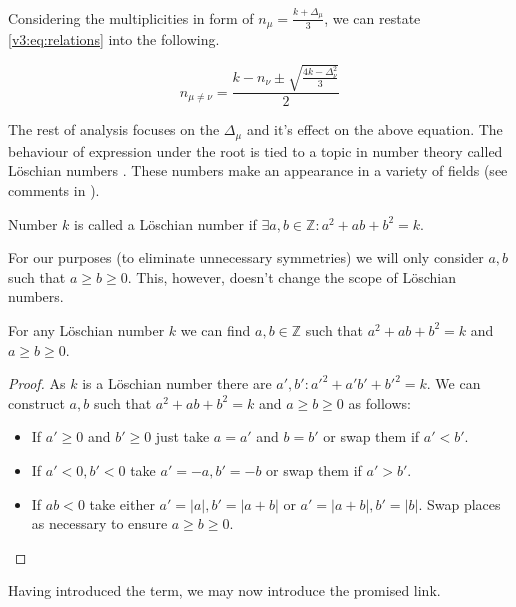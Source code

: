     Considering the multiplicities in form of $n_\mu = \frac{k+\Delta_\mu}{3}$, we can restate \eqref{v3:eq:relations} into the following.

    \begin{equation}
        \label{v3:eq:relations_delta}
        n_{\mu\neq \nu} = \frac{k-n_\nu \pm \sqrt{\frac{4k-\Delta_\nu^2}{3}}}{2}
    \end{equation}

    The rest of analysis focuses on the $\Delta_\mu$ and it's effect on the above equation. The behaviour of expression under the root is tied to a topic in number theory called Löschian numbers \cite{oeisA003136}. These numbers make an appearance in a variety of fields (see comments in \cite{oeisA003136}).

    \begin{definition}
        \label{v3:def:loeshian}
        Number $k$ is called a Löschian number if $\exists a,b \in \mathbb Z \colon a^2+ab+b^2=k$.
    \end{definition}

    For our purposes (to eliminate unnecessary symmetries) we will only consider $a,b$ such that $a \geq b \geq 0$. This, however, doesn't change the scope of Löschian numbers.

    \begin{lemma}
        \label{v3:lemma:loeschian}
        For any Löschian number $k$ we can find $a,b \in \mathbb Z$ such that $a^2+ab+b^2=k$ and $a \geq b \geq 0$.
    \end{lemma}

    \begin{proof}
        As $k$ is a Löschian number there are $a',b' \colon a'^2+a'b'+b'^2=k$. We can construct $a,b$ such that $a^2+ab+b^2=k$ and $a \geq b \geq 0$ as follows:
        \begin{itemize}
            \item If $a' \geq 0$ and $b' \geq 0$ just take $a=a'$ and $b=b'$ or swap them if $a'<b'$.
            \item If $a'<0,b'<0$ take $a'=-a,b'=-b$ or swap them if $a'>b'$.
            \item If $ab<0$ take either $a'=|a|, b'=|a+b|$ or $a'=|a+b|, b'=|b|$. Swap places as necessary to ensure $a \geq b \geq 0$.
        \end{itemize}
    \end{proof}

    Having introduced the term, we may now introduce the promised link.

